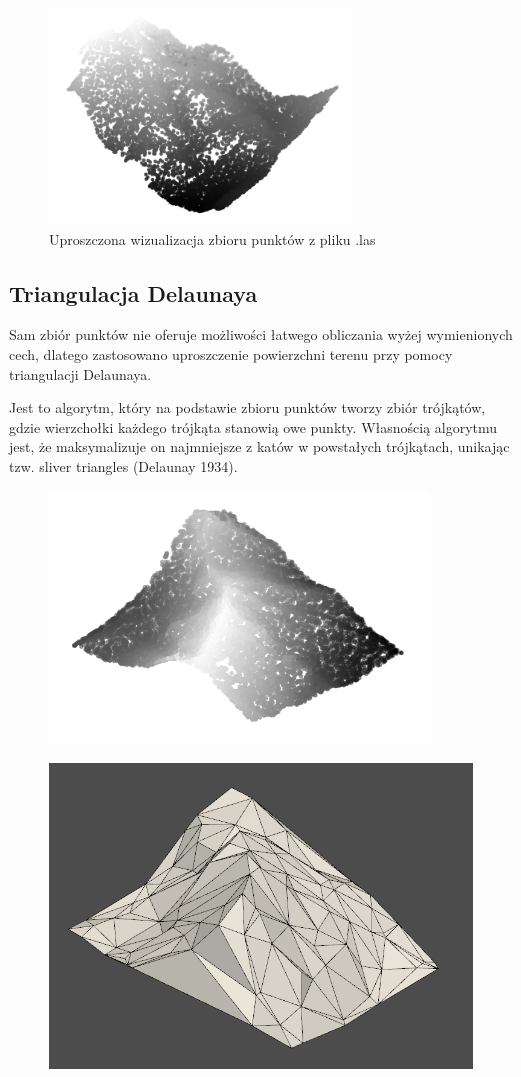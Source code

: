 \begin{figure}[h]
	\includegraphics[width=8cm]{las_example}
	\centering
	\caption{Uproszczona wizualizacja zbioru punktów z pliku .las}
\end{figure}

\subsection{Triangulacja Delaunaya}
Sam zbiór punktów nie oferuje możliwości łatwego obliczania wyżej wymienionych cech, dlatego zastosowano uproszczenie powierzchni terenu przy pomocy triangulacji Delaunaya.

Jest to algorytm, który na podstawie zbioru punktów tworzy zbiór trójkątów, gdzie wierzchołki każdego trójkąta stanowią owe punkty. Własnością algorytmu jest, że maksymalizuje on najmniejsze z katów w powstałych trójkątach, unikając tzw. sliver triangles (Delaunay 1934).


\begin{figure}[h]
	\centering
	\begin{minipage}{.5\textwidth}
		\centering
		\includegraphics[width=.6\linewidth]{no_delaunay}
		\label{fig:test1}
	\end{minipage}%
	\begin{minipage}{.5\textwidth}
		\centering
		\includegraphics[width=.6\linewidth]{delaunay}
		\label{fig:test2}
	\end{minipage}
\end{figure}

